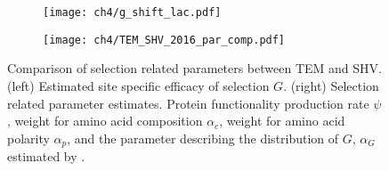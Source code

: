 \begin{figure}[h]
    \centering
    \begin{subfigure}
        \centering
        \texttt{[image: ch4/g\_shift\_lac.pdf]}
    \end{subfigure}
    \begin{subfigure}
        \centering
        \texttt{[image: ch4/TEM\_SHV\_2016\_par\_comp.pdf]}
    \end{subfigure}
    \caption{Comparison of selection related parameters between TEM and SHV. 
    (left) Estimated site specific efficacy of selection $G$. 
    (right) Selection related parameter estimates. 
    Protein functionality production rate $\psi$, \PC weight for amino acid composition $\alpha_c$, \PC weight for amino acid polarity $\alpha_p$, and the parameter describing the distribution of $G$, $\alpha_G$ estimated by \selac.}
    \label{fig:tem_shv_param_comp}
\end{figure}

\doublespacing